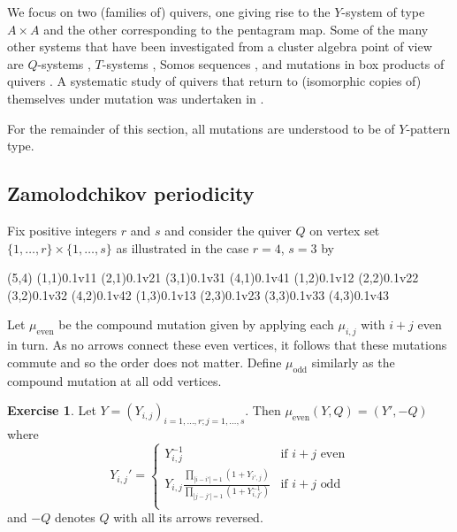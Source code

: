 \documentclass{amsart}
\theoremstyle{definition}
\newtheorem{exercise}[theorem]{Exercise}
\theoremstyle{remark}
\numberwithin{equation}{section}
\begin{document}
	We focus on two (families of) quivers, one giving rise to the $Y$-system of type $A \times A$ and the other corresponding to the pentagram map. Some of the many other systems that have been investigated from a cluster algebra point of view are $Q$-systems \cite{dFK10}, $T$-systems \cite{dFK09}, Somos sequences \cite{H07}, and mutations in box products of quivers \cite{P15}. A systematic study of quivers that return to (isomorphic copies of) themselves under mutation was undertaken in \cite{FM11}.

For the remainder of this section, all mutations are understood to be of $Y$-pattern type.

\subsection{Zamolodchikov periodicity}
	Fix positive integers $r$ and $s$ and consider the quiver $Q$ on vertex set $\{1,\ldots, r \} \times \{1,\ldots, s\}$ as illustrated in the case $r=4$, $s=3$ by
	
	\begin{pspicture}(5,4)
		\cnode(1,1){0.1}{v11}
		\cnode(2,1){0.1}{v21}
		\cnode(3,1){0.1}{v31}
		\cnode(4,1){0.1}{v41}
		\cnode(1,2){0.1}{v12}
		\cnode(2,2){0.1}{v22}
		\cnode(3,2){0.1}{v32}
		\cnode(4,2){0.1}{v42}
		\cnode(1,3){0.1}{v13}
		\cnode(2,3){0.1}{v23}
		\cnode(3,3){0.1}{v33}
		\cnode(4,3){0.1}{v43}
	\end{pspicture}
	
	Let $\mu_{\textrm{even}}$ be the compound mutation given by applying each $\mu_{i,j}$ with $i+j$ even in turn.  As no arrows connect these even vertices, it follows that these mutations commute and so the order does not matter.  Define $\mu_{\textrm{odd}}$ similarly as the compound mutation at all odd vertices.
	
	\begin{exercise}
		Let $Y = (Y_{i,j})_{i=1,\ldots, r; j=1,\ldots, s}$.  Then $\mu_{\textrm{even}}(Y,Q) = (Y',-Q)$ where
		\begin{equation} \label{eq:YSystemCases}
			Y_{i,j}' = \begin{cases}
			Y_{i,j}^{-1} & \textrm{if $i+j$ even} \\
			Y_{i,j}\frac{\displaystyle\prod_{|i-i'|=1}(1+Y_{i',j})}{\displaystyle\prod_{|j-j'|=1}(1+Y_{i,j'}^{-1})} & \textrm{if $i+j$ odd} \\
			\end{cases}
		\end{equation}
		and $-Q$ denotes $Q$ with all its arrows reversed.
	\end{exercise}
	
\end{document}
